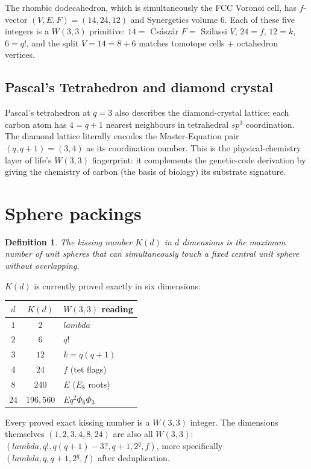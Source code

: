 \documentclass[11pt]{article}
\def\textbf#1{#1}%
\def\lambda{lambda}%
\def\Phi#1{Phi#1}%
\def\cdot{ }%
\newtheorem*{definition}{Definition}
\begin{document}
The rhombic dodecahedron, which is simultaneously the FCC Voronoi cell, has $f$-vector $(V, E, F) = (14, 24, 12)$ and Synergetics volume $6$. \textbf{Each of these five integers is a $W(3,3)$ primitive:} $14 = $ Császár $F = $ Szilassi $V$, $24 = f$, $12 = k$, $6 = q!$, and the split $V = 14 = 8 + 6$ matches tomotope cells + octahedron vertices.

\subsection*{Pascal's Tetrahedron and diamond crystal}

Pascal's tetrahedron at $q = 3$ also describes the \textbf{diamond-crystal lattice}: each carbon atom has $4 = q+1$ nearest neighbours in tetrahedral $sp^3$ coordination. The diamond lattice literally encodes the Master-Equation pair $(q, q+1) = (3, 4)$ as its coordination number. This is the physical-chemistry layer of life's $W(3,3)$ fingerprint: it complements the genetic-code derivation by giving the chemistry of carbon (the basis of biology) its substrate signature.

\section{Sphere packings}

\begin{definition}
The \textbf{kissing number} $K(d)$ in $d$ dimensions is the maximum number of unit spheres that can simultaneously touch a fixed central unit sphere without overlapping.
\end{definition}

$K(d)$ is currently proved exactly in six dimensions:
\begin{center}
\begin{tabular}{c|c|l}
\toprule
$d$ & $K(d)$ & $W(3,3)$ reading \\
\midrule
$1$ & $2$ & $\lambda$ \\
$2$ & $6$ & $q!$ \\
$3$ & $12$ & $k = q(q+1)$ \\
$4$ & $24$ & $f$ (tet flags) \\
$8$ & $240$ & $E$ ($E_8$ roots) \\
$24$ & $196{,}560$ & $E \cdot q^2 \cdot \Phi_6 \cdot \Phi_3$ \\
\bottomrule
\end{tabular}
\end{center}

\textbf{Every proved exact kissing number is a $W(3,3)$ integer.} The dimensions themselves $(1, 2, 3, 4, 8, 24)$ are also all $W(3,3)$: $(\lambda, q!, q(q+1) - 3?, q+1, 2^q, f)$, more specifically $(\lambda, q, q+1, 2^q, f)$ after deduplication.
\end{document}

